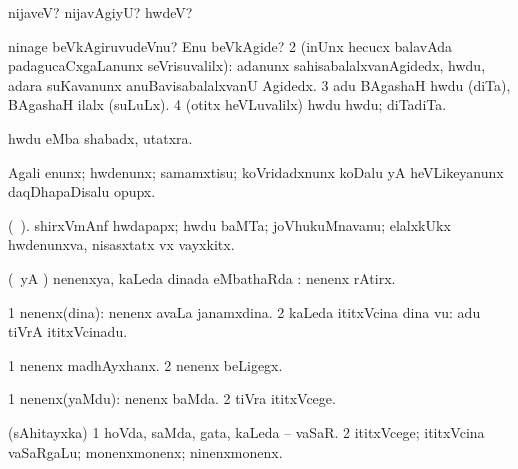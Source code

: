 \noindent                         
\gl{\pagu}
\bmng
\bnum
{}  
\banum
{} nijaveV? nijavAgiyU? hwdeV? 

  ninage beVkAgiruvudeVnu? Enu beVkAgide? 
\eanum
\numie
\num{2}  (inUnx hecucx balavAda padagucaCxgaLanunx seVrisuvalilx):  adanunx sahisabalalxvanAgidedx, hwdu, adara suKavanunx anuBavisabalalxvanU Agidedx.   
\num{3}  adu BAgashaH hwdu (diTa), BAgashaH ilalx (suLuLx). 
\num{4}  (otitx heVLuvalilx) hwdu hwdu; diTadiTa.
\enum
\emng
\eentry

\bentry
{} 
\gl{\nA} 
\bmng
hwdu eMba shabadx, utatxra.
\emng

\noindent
\gl{\pagu}
\bmng
{} Agali enunx; hwdenunx; samamxtisu; koVridadxnunx koDalu yA heVLikeyanunx daqDhapaDisalu opupx.
\emng
\eentry

\bentry
{} 
\gl{\nA} 
\bmng
(\bava\ ). 
shirxVmAnf hwdapapx; hwdu baMTa; joVhukuMnavanu; elalxkUkx hwdenunxva, nisasxtatx vx vayxkitx.
\emng
\eentry

\bentry
{} 
\gl{\sapUpa} 
\bmng
(\pArxparx\ yA \kAparx) nenenxya, kaLeda dinada eMbathaRda \sapUpa:  nenenx  rAtirx.
\emng
\eentry

\bentry
{} 
\gl{\nA} 
\bmng
\bnum
\num{1} nenenx(dina):  nenenx avaLa janamxdina. 
\num{2} kaLeda ititxVcina dina \mo vu:   adu tiVrA ititxVcinadu.
\enum
\emng 

\noindent
\gl{\pagu}
\bmng
\bnum
\num{1}  nenenx madhAyxhanx. 
\num{2}  nenenx beLigegx.
\enum
\emng
\eentry

\bentry
{} 
\gl{\kirxvi} 
\bmng
\bnum
\num{1} nenenx(yaMdu):   nenenx baMda. 
\num{2} tiVra ititxVcege.
\enum
\emng
\eentry

\bentry
{} 
\gl{\nA} 
\bmng
(sAhitayxka) 
\bnum
\num{1} hoVda, saMda, gata, kaLeda -- vaSaR. 
\num{2} ititxVcege; ititxVcina vaSaRgaLu; monenxmonenx; ninenxmonenx.
\enum
\emng
\eentry

